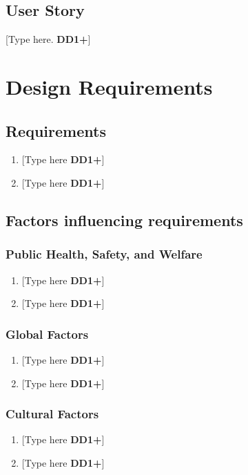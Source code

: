 \documentclass[letterpaper, 11pt]{article}
\begin{document}
\subsection{User Story}
[Type here. \textbf{DD1+}]

\clearpage

\section{Design Requirements}
\subsection{Requirements}
\begin{enumerate}
    \item {[Type here \textbf{DD1+}]}
    \item {[Type here \textbf{DD1+}]}
\end{enumerate}

\clearpage

\subsection{Factors influencing requirements}
\subsubsection{Public Health, Safety, and Welfare}
\begin{enumerate}
    \item {[Type here \textbf{DD1+}]}
    \item {[Type here \textbf{DD1+}]}
\end{enumerate}

\subsubsection{Global Factors}
\begin{enumerate}
    \item {[Type here \textbf{DD1+}]}
    \item {[Type here \textbf{DD1+}]}
\end{enumerate}

\subsubsection{Cultural Factors}
\begin{enumerate}
    \item {[Type here \textbf{DD1+}]}
    \item {[Type here \textbf{DD1+}]}
\end{enumerate}
\end{document}
